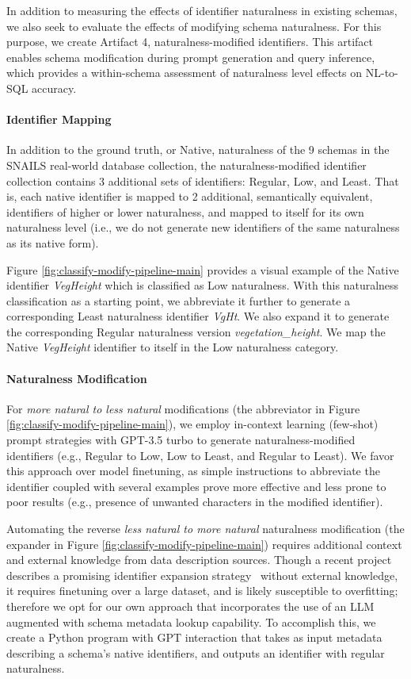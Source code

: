 In addition to measuring the effects of identifier naturalness in existing schemas, we also seek to evaluate the effects of modifying schema naturalness.
For this purpose, we create Artifact 4, naturalness-modified identifiers.
This artifact enables schema modification during prompt generation and query inference, which provides a within-schema assessment of naturalness level effects on NL-to-SQL accuracy.

\paragraph{\textbf{Identifier Mapping}}
In addition to the ground truth, or Native, naturalness of the 9 schemas in the SNAILS real-world database collection, the naturalness-modified identifier collection contains 3 additional sets of identifiers: Regular, Low, and Least.
That is, each native identifier is mapped to 2 additional, semantically equivalent, identifiers of higher or lower naturalness, and mapped to itself for its own naturalness level (i.e., we do not generate new identifiers of the same naturalness as its native form).



Figure \ref{fig:classify-modify-pipeline-main} provides a visual example of the Native identifier \emph{VegHeight} which is classified as Low naturalness.
With this naturalness classification as a starting point, we abbreviate it further to generate a corresponding Least naturalness identifier \emph{VgHt}.
We also expand it to generate the corresponding Regular naturalness version \emph{vegetation\_height}.
We map the Native \emph{VegHeight} identifier to itself in the Low naturalness category.

\paragraph{\textbf{Naturalness Modification}}
For \emph{more natural to less natural} modifications (the abbreviator in Figure \ref{fig:classify-modify-pipeline-main}), we employ in-context learning (few-shot) prompt strategies with GPT-3.5 turbo to generate naturalness-modified identifiers (e.g., Regular to Low, Low to Least, and Regular to Least).
We favor this approach over model finetuning, as simple instructions to abbreviate the identifier coupled with several examples prove more effective and less prone to poor results (e.g., presence of unwanted characters in the modified identifier).

Automating the reverse \emph{less natural to more natural} naturalness modification (the expander in Figure \ref{fig:classify-modify-pipeline-main}) requires additional context and external knowledge from data description sources.
Though a recent project describes a promising identifier expansion strategy~\cite{nameguess} without external knowledge, it requires finetuning over a large dataset, and is likely susceptible to overfitting; therefore we opt for our own approach that incorporates the use of an LLM augmented with schema metadata lookup capability.
To accomplish this, we create a Python program with GPT interaction that takes as input metadata describing a schema's native identifiers, and outputs an identifier with regular naturalness.


